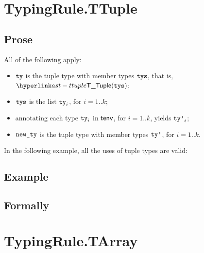 \section{TypingRule.TTuple \label{sec:TypingRule.TTuple}}

\subsection{Prose}
All of the following apply:
\begin{itemize}
  \item $\tty$ is the tuple type with member types $\tys$, that is, $\TTuple(\tys)$;
  \item $\tys$ is the list $\tty_i$, for $i=1..k$;
  \item annotating each type $\tty_i$ in $\tenv$, for $i=1..k$,
  yields $\ttyp_i$\ProseOrTypeError;
  \item $\newty$ is the tuple type with member types $\ttyp$, for $i=1..k$.
\end{itemize}

In the following example, all the uses of tuple types are valid:
\subsection{Example}


\subsection{Formally}
\begin{mathpar}
\end{mathpar}


\section{TypingRule.TArray \label{sec:TypingRule.TArray}}

